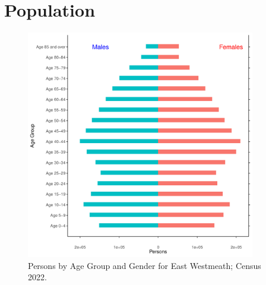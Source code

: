 \documentclass{article}
\begin{document}
\pagebreak

\section{Population} 
\label{sect:Pop}

\begin{figure}[h]
	\centering
	\includegraphics[width = 100mm]{../figures/PyramidPlot.pdf}
	\caption{Persons by Age Group and Gender for East Westmeath; Census 2022.}
	\label{fig:2ae19629-1a6a-13a3-e055-000000000001}
	\end{figure}
\end{document}
